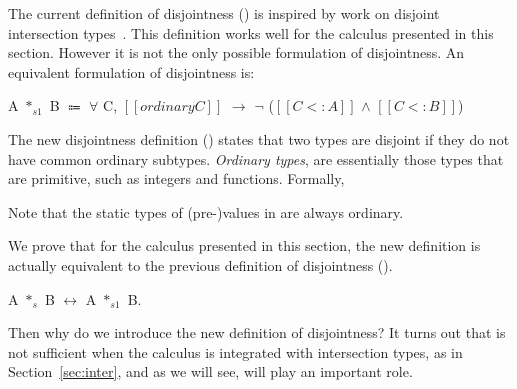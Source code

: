 The current definition of disjointness () is inspired
by work on disjoint intersection types~\cite{oliveira2016disjoint}. This definition works well
for the calculus presented in this section. However it is not the only
possible formulation of disjointness.
An equivalent formulation of disjointness is:

\begin{definition}
    A $*_{s1}$ B $\Coloneqq$ $\forall$ C, $[[ordinary C]]$ $\rightarrow$ $\neg$ ($[[C <: A]]$ $\wedge$ $[[C <: B]]$)
    \label{def:union:disj1}
  \end{definition}

\noindent
The new disjointness definition () states that two
types are disjoint if they do not have common ordinary subtypes.
\emph{Ordinary types}, are essentially
those types that are primitive, such as integers and functions. Formally,

\medskip

\noindent Note that the static types of (pre-)values in \name are always ordinary.

We prove that for the calculus presented in this section, the new definition is
actually equivalent to the previous definition of disjointness
().

\begin{lemma}
A $*_{s}$ B $\longleftrightarrow$ A $*_{s1}$ B.
\end{lemma}

Then why do we introduce the new definition of disjointness? It turns out that
 is not sufficient when the calculus is integrated with
intersection types, as in Section~\ref{sec:inter}, and as we will see,
 will play an important role.

